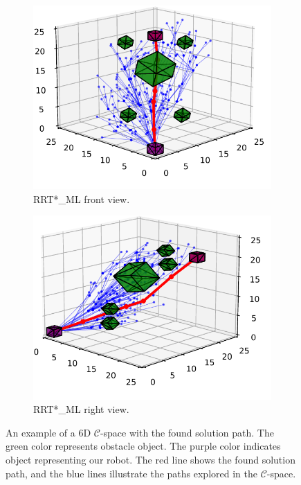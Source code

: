 \documentclass{ctuthesis}
\begin{document}
\begin{figure}[!ht]
\begin{subfigure}[b]{0.49\textwidth}
  \end{subfigure}
  \begin{subfigure}[b]{0.49\textwidth}
    \includegraphics[width=\textwidth]{figChap5/6D_RRTstarFront_ML.pdf}
    \caption{RRT*\_ML front view.}
  \end{subfigure}
  \begin{subfigure}[b]{0.49\textwidth}
    \includegraphics[width=\textwidth]{figChap5/6D_RRTstraRight_ML.pdf}
    \caption{RRT*\_ML right view.}
\end{subfigure}
  \caption{An example of a 6D $\mathcal{C}$-space with the found solution path. 
  The green color represents obstacle object. 
  The purple color indicates object representing our robot. 
  The red line shows the found solution path, 
  and the blue lines illustrate the paths explored in the $\mathcal{C}$-space.}
  \label{fig:6Dconfig-space_chap5}
\end{figure}
\end{document}

